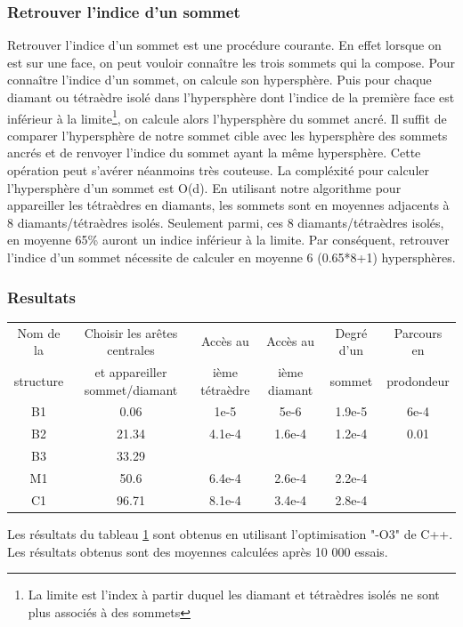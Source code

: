 \documentclass[a4paper,11pt,openany]{article}
\begin{document}
\subsubsection{Retrouver l'indice d'un sommet}
\label{Retrouver l'indice d'un sommet}
\noindent
Retrouver l'indice d'un sommet est une procédure courante. En effet lorsque on est sur une face, on peut vouloir connaître les trois sommets qui la compose. Pour connaître l'indice d'un sommet, on calcule son hypersphère. Puis pour chaque diamant ou tétraèdre isolé dans l'hypersphère dont l'indice de la première face est inférieur à la limite\footnote{La limite est l'index à partir duquel les diamant et tétraèdres isolés ne sont plus associés à des sommets}, on calcule alors l'hypersphère du sommet ancré. Il suffit de comparer l'hypersphère de notre sommet cible avec les hypersphère des sommets ancrés et de renvoyer l'indice du sommet ayant la même hypersphère. Cette opération peut s'avérer néanmoins très couteuse. La compléxité pour calculer l'hypersphère d'un sommet est O(d). En utilisant notre algorithme pour appareiller les tétraèdres en diamants, les sommets sont en moyennes adjacents à 8 diamants/tétraèdres isolés. Seulement parmi, ces 8 diamants/tétraèdres isolés, en moyenne 65\% auront un indice inférieur à la limite. Par conséquent, retrouver l'indice d'un sommet nécessite de calculer en moyenne 6 (0.65*8+1) hypersphères.
\subsubsection{Resultats}
\noindent
\begin{table}[H]
\footnotesize
\begin{tabular}{| c | c | c | c| c |c |}
\hline
Nom de la  & Choisir les arêtes centrales & Accès au& Accès au & Degré d'un & Parcours en\\
structure & et appareiller sommet/diamant &ième tétraèdre& ième diamant &sommet&prodondeur\\
\hline
B1  & 0.06 & 1e-5 & 5e-6 & 1.9e-5 & 6e-4\\
B2 & 21.34 &  4.1e-4 & 1.6e-4 & 1.2e-4 & 0.01\\
B3 & 33.29 & & & & \\
M1  & 50.6 & 6.4e-4 & 2.6e-4 & 2.2e-4 & \\
C1  & 96.71 & 8.1e-4 & 3.4e-4 & 2.8e-4 & \\
\hline  
\end{tabular}
\label{Tab:results_time}
\end{table}
\noindent
Les résultats du tableau \ref{Tab:results_time} sont obtenus en utilisant l'optimisation "-O3" de C++. Les résultats obtenus sont des moyennes calculées après 10 000 essais.
\end{document}
